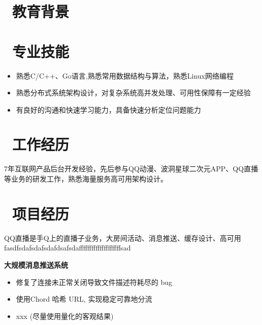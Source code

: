 \documentclass{resume}
\begin{document}


 
\section{\faGraduationCap\ 教育背景}

\section{\faCogs\ 专业技能}
\begin{itemize}[parsep=0.5ex]
  \item 熟悉C/C++、Go语言,熟悉常用数据结构与算法，熟悉Linux网络编程
  \item 熟悉分布式系统架构设计，对复杂系统高并发处理、可用性保障有一定经验
  \item 有良好的沟通和快速学习能力，具备快速分析定位问题能力
\end{itemize}

\section{\faUsers\ 工作经历}
{7年互联网产品后台开发经验，先后参与QQ动漫、波洞星球二次元APP、QQ直播等业务的研发工作，熟悉海量服务高可用架构设计。}

\section{\faThList\ 项目经历}
{QQ直播是手Q上的直播子业务，大房间活动、消息推送、缓存设计、高可用fasdfsdafsdafsdafdsafsdaffffffffffffffffffffsad} \\
\begin{onehalfspacing}
\textbf{大规模消息推送系统}
\begin{itemize}
  \item 修复了连接未正常关闭导致文件描述符耗尽的 bug
  \item 使用Chord 哈希 URL, 实现稳定可靠地分流
  \item xxx (尽量使用量化的客观结果)
\end{itemize}
\end{onehalfspacing}
\end{document}
